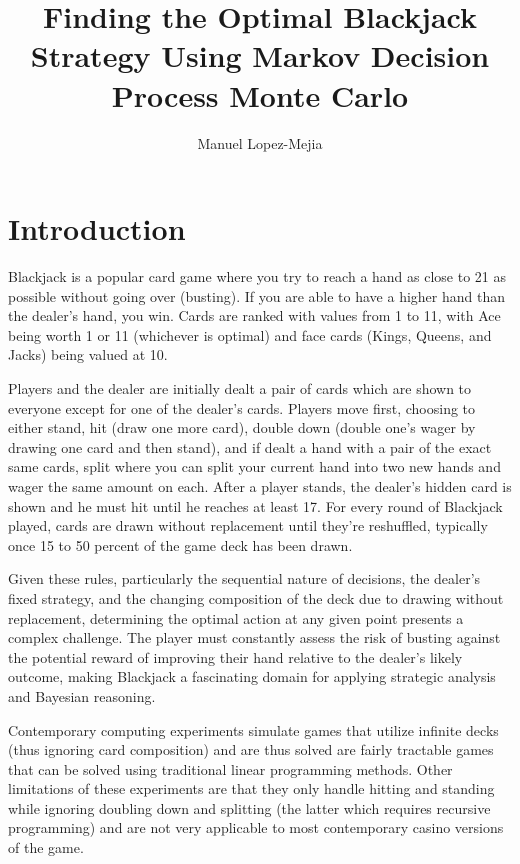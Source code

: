 \documentclass[12pt,a4paper]{cibb}
\title{\Large $\ $\\ \bf Finding the Optimal Blackjack Strategy Using Markov Decision Process Monte Carlo}
\author{\large Manuel Lopez-Mejia}
\begin{document}
\thispagestyle{myheadings}
\pagestyle{myheadings}

\section{Introduction}
\label{sec:SCIENTIFIC-BACKGROUND}

Blackjack is a popular card game where you try to reach a hand as close to 21 as possible without going over (busting). If you are able to have a higher hand than the dealer's hand, you win. Cards are ranked with values from 1 to 11, with Ace being worth 1 or 11 (whichever is optimal) and face cards (Kings, Queens, and Jacks) being valued at 10.

Players and the dealer are initially dealt a pair of cards which are shown to everyone except for one of the dealer's cards. Players move first, choosing to either stand, hit (draw one more card), double down (double one's wager by drawing one card and then stand), and if dealt a hand with a pair of the exact same cards, split where you can split your current hand into two new hands and wager the same amount on each. After a player stands, the dealer's hidden card is shown and he must hit until he reaches at least 17. For every round of Blackjack played, cards are drawn without replacement until they're reshuffled, typically once 15 to 50 percent of the game deck has been drawn.

Given these rules, particularly the sequential nature of decisions, the dealer's fixed strategy, and the changing composition of the deck due to drawing without replacement, determining the optimal action at any given point presents a complex challenge. The player must constantly assess the risk of busting against the potential reward of improving their hand relative to the dealer's likely outcome, making Blackjack a fascinating domain for applying strategic analysis and Bayesian reasoning. 

Contemporary computing experiments simulate games that utilize infinite decks (thus ignoring card composition) \cite{robprattsas} \cite{connie-trojan} \cite{aman-khurna} and are thus solved are fairly tractable games that can be solved using traditional linear programming methods. Other limitations of these experiments are that they only handle hitting and standing while ignoring doubling down and splitting (the latter which requires recursive programming) and are not very applicable to most contemporary casino versions of the game.
\end{document}
